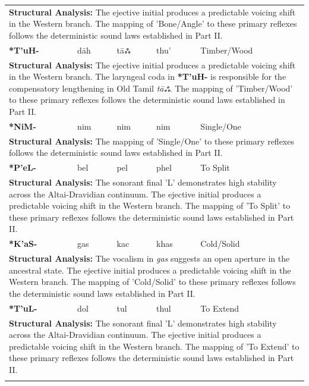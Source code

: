 \begin{longtable}{p{} p{} p{} p{} p{}}
\multicolumn{5}{p{\textwidth}}{\small \textbf{Structural Analysis:} The ejective initial produces a predictable voicing shift in the Western branch. The mapping of 'Bone/Angle' to these primary reflexes follows the deterministic sound laws established in Part II.} \\ \addlinespace[15pt] 
\textbf{*T'uH-} & dāh & tāஃ & thu' & Timber/Wood \\ 
\multicolumn{5}{p{\textwidth}}{\small \textbf{Structural Analysis:} The ejective initial produces a predictable voicing shift in the Western branch. The laryngeal coda in \textbf{*T'uH-} is responsible for the compensatory lengthening in Old Tamil \textit{tāஃ}. The mapping of 'Timber/Wood' to these primary reflexes follows the deterministic sound laws established in Part II.} \\ \addlinespace[15pt] 
\textbf{*NiM-} & nim & nim & nim & Single/One \\ 
\multicolumn{5}{p{\textwidth}}{\small \textbf{Structural Analysis:}  The mapping of 'Single/One' to these primary reflexes follows the deterministic sound laws established in Part II.} \\ \addlinespace[15pt] 
\textbf{*P'eL-} & bel & pel & phel & To Split \\ 
\multicolumn{5}{p{\textwidth}}{\small \textbf{Structural Analysis:} The sonorant final 'L' demonstrates high stability across the Altai-Dravidian continuum. The ejective initial produces a predictable voicing shift in the Western branch. The mapping of 'To Split' to these primary reflexes follows the deterministic sound laws established in Part II.} \\ \addlinespace[15pt] 
\textbf{*K'aS-} & gas & kac & khas & Cold/Solid \\ 
\multicolumn{5}{p{\textwidth}}{\small \textbf{Structural Analysis:} The vocalism in \textit{gas} suggests an open aperture in the ancestral state. The ejective initial produces a predictable voicing shift in the Western branch. The mapping of 'Cold/Solid' to these primary reflexes follows the deterministic sound laws established in Part II.} \\ \addlinespace[15pt] 
\textbf{*T'uL-} & dol & tul & thul & To Extend \\ 
\multicolumn{5}{p{\textwidth}}{\small \textbf{Structural Analysis:} The sonorant final 'L' demonstrates high stability across the Altai-Dravidian continuum. The ejective initial produces a predictable voicing shift in the Western branch. The mapping of 'To Extend' to these primary reflexes follows the deterministic sound laws established in Part II.} \\ \addlinespace[15pt] 

\end{longtable}
